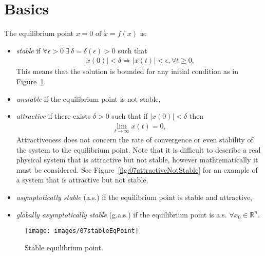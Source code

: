 \mainmatter%
\setcounter{page}{1}

\lectureseries[\course]{\course}

\date{January 26, 2010}

\setaddress%

\setcounter{lecture}{6}
\setcounter{chapter}{6}


\section{Basics}
\begin{definition}
The equilibrium point $x=0$ of $\dot{x}=f(x)$ is:
\begin{itemize}
\item \textit{stable} if $\forall \epsilon > 0~\exists~\delta=\delta(\epsilon)>0$ such that
\begin{align*}
|x(0)| < \delta \Rightarrow |x(t)| < \epsilon, \forall t\geq0,
\end{align*}
This means that the solution is bounded for any initial condition as in Figure~\ref{fig:07stableEqPoint}.
\item \textit{unstable} if the equilibrium point is not stable,
\item \textit{attractive} if there exists $\delta>0$ such that if $|x(0)|<\delta$ then
\begin{align*}
\lim_{t\to\infty}x(t) = 0,
\end{align*}
Attractiveness does not concern the rate of convergence or even stability of the system to the equilibrium point.
Note that it is difficult to describe a real physical system that is attractive but not stable, however mathtematically it must be considered.
See Figure~\ref{fig:07attractiveNotStable} for an example of a system that is attractive but not stable.
\item \textit{asymptotically stable} (a.s.) if the equilibrium point is stable and attractive,
\item \textit{globally asymptotically stable} (g.a.s.) if the equilibrium point is a.s. $\forall x_0\in\mathbb{R}^n$.
\end{itemize}
\end{definition}

\begin{figure}[ht!]
\centering
\texttt{[image: images/07stableEqPoint]}
\caption{Stable equilibrium point.}%
\label{fig:07stableEqPoint}
\end{figure}

